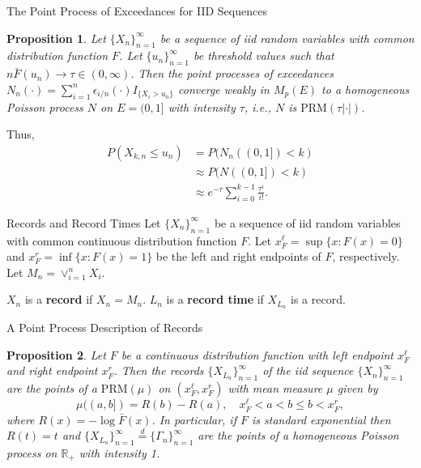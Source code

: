 \documentclass{beamer}
\newcommand{\PRM}{\text{PRM}}
\newtheorem{proposition}{Proposition}
\begin{document}
\begin{frame}{The Point Process of Exceedances for IID Sequences}
    \begin{proposition}
        Let $\{X_n\}_{n = 1}^{\infty}$ be a sequence of iid random variables with common distribution function $F$. Let $\{u_n\}_{n = 1}^{\infty}$ be threshold values such that $n\bar{F}(u_n) \to \tau \in (0, \infty)$. Then the point processes of exceedances $N_n(\cdot) = \sum_{i = 1}^n \epsilon_{i / n}(\cdot)I_{\{X_i > u_n\}}$ converge weakly in $M_p(E)$ to a homogeneous Poisson process $N$ on $E = (0, 1]$ with intensity $\tau$, i.e., $N$ is $\PRM(\tau|\cdot|)$.
    \end{proposition}

    Thus,
    \begin{align*}
        P(X_{k, n} \le u_n) &= P(N_n((0, 1]) < k) \\
        &\approx P(N((0, 1]) < k) \\
        &\approx e^{-\tau}\sum_{i = 0}^{k - 1} \frac{\tau^i}{i!}.
    \end{align*}
\end{frame}

\begin{frame}{Records and Record Times}
    Let $\{X_n\}_{n = 1}^{\infty}$ be a sequence of iid random variables with common continuous distribution function $F$. Let $x_F^{\ell} = \sup\{x : F(x) = 0\}$ and $x_F^r = \inf\{x : F(x) = 1\}$ be the left and right endpoints of $F$, respectively. Let $M_n = \vee_{i = 1}^n X_i$.

    \smallskip

    $X_n$ is a \textbf{record} if $X_n = M_n$. $L_n$ is a \textbf{record time} if $X_{L_n}$ is a record.
\end{frame}

\begin{frame}{A Point Process Description of Records}
    \begin{proposition}
        Let $F$ be a continuous distribution function with left endpoint $x_F^{\ell}$ and right endpoint $x_F^r$. Then the records $\{X_{L_n}\}_{n = 1}^{\infty}$ of the iid sequence $\{X_n\}_{n = 1}^{\infty}$ are the points of a $\PRM(\mu)$ on $(x_F^{\ell}, x_F^r)$ with mean measure $\mu$ given by
        \[
        \mu((a, b]) = R(b) - R(a), \quad x_F^{\ell} < a < b \le b < x_F^r,
        \]
        where $R(x) = -\log\bar{F}(x)$. In particular, if $F$ is standard exponential then $R(t) = t$ and $\{X_{L_n}\}_{n = 1}^{\infty} \overset{d}{=} \{\Gamma_n\}_{n = 1}^{\infty}$ are the points of a homogeneous Poisson process on $\mathbb{R}_+$ with intensity 1.
    \end{proposition}
\end{frame}
\end{document}
